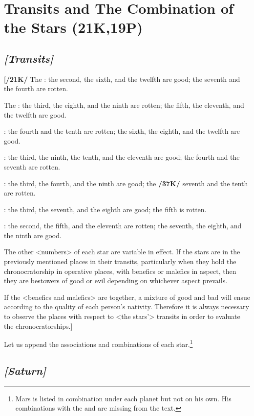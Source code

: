 \section{Transits and The Combination of the Stars (21K,19P)}

\subsection{\textit{[Transits]}}
[\textbf{/21K/}
The \Sun: the second, the sixth, and the twelfth are good; the seventh and the fourth are rotten.

The \Moon: the third, the eighth, and the ninth are rotten; the fifth, the eleventh, and the twelfth are good.

\Saturn: the fourth and the tenth are rotten; the sixth, the eighth, and the twelfth are good.

\Jupiter: the third, the ninth, the tenth, and the eleventh are good; the fourth and the seventh are rotten.

\Mars: the third, the fourth, and the ninth are good; the \textbf{/37K/} seventh and the tenth are rotten.

\Venus: the third, the seventh, and the eighth are good; the fifth is rotten.

\Mercury: the second, the fifth, and the eleventh are rotten; the seventh, the eighth, and the ninth are good.

\mndl[0.2cm]
The other <numbers> of each star are variable in effect.
If the stars are in the previously mentioned places in their transits, particularly when they hold the chronocratorship in operative places, with benefics or malefics in aspect, then they are bestowers of good or evil depending on whichever aspect prevails. 

\mnm[0.3cm]
If the <benefics and malefics> are together, a mixture of good and bad will ensue according to the quality of each person’s nativity. Therefore it is always necessary to
observe the places with respect to <the stars’> transits in order to evaluate the chronocratorships.]

Let us append the associations and combinations of each star.\enlargethispage{2\baselineskip}\footnote{Mars is listed in combination under each planet but not on his own. His combinations with the \Sun\xspace and \Moon\xspace are missing from the text.}



\secbr
{}
\subsection{\textit{[Saturn]}}

